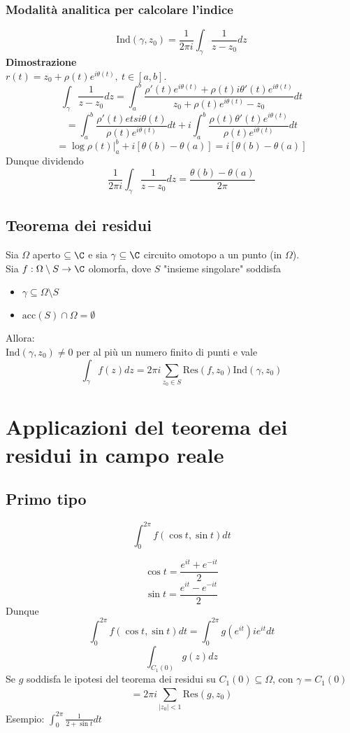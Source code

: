 \subsubsection{Modalità analitica per calcolare l'indice}
\[\text{Ind}(\gamma, z_0)=\frac{1}{2\pi i} \int_{\gamma}^{} \frac{1}{z-z_0}dz\]
\textbf{Dimostrazione} 
\\$r(t)=z_0+\rho(t)e^{i\theta(t)},\ t\in[a,b]$.
\[\int_{\gamma}^{} \frac{1}{z-z_0}dz=\int_{a}^{b} \frac{\rho'(t)e^{i\theta(t)}+\rho(t)i\theta'(t)e^{i\theta(t)}}{z_0+\rho(t)e^{i\theta(t)}-z_0}dt\]
\[=\int_{a}^{b} \frac{\rho'(t)etsi\theta(t)}{\rho(t)e^{i\theta(t)}}dt+i \int_{a}^{ b} \frac{\rho(t)\theta'(t)e^{i\theta(t)}}{\rho(t) e^{i\theta(t)}}dt\]
\[=\log\rho(t)|_a^b+i[\theta(b)-\theta(a)]=i[\theta(b)-\theta(a)]\]
Dunque dividendo
\[\frac{1}{2\pi i}\int_{\gamma}^{} \frac{1}{z-z_0}dz=\frac{\theta(b)-\theta(a)}{2\pi}\]
\subsection{Teorema dei residui}
\begin{tcolorbox}
	Sia $\Omega$ aperto $\subseteq\C$ e sia  $\gamma \subseteq\C$ circuito omotopo a un punto (in $\Omega$).
	\\Sia $f:\Omega\setminus S\to \C$ olomorfa, dove $S$ "insieme singolare" soddisfa
	\begin{itemize}
		\item $\gamma \subseteq\Omega \setminus S$
		\item $\text{acc} (S)\cap\Omega = \emptyset$
	\end{itemize}
	Allora:
	\\$\text{Ind}(\gamma,z_0)\neq 0$ per al più un numero finito di punti e vale
	\[\int_{\gamma}^{} f(z)dz=2\pi i \sum_{z_0\in S}^{} \text{Res}(f,z_0)\text{Ind}(\gamma,z_0)\] 
\end{tcolorbox}


\section{Applicazioni del teorema dei residui in campo reale}
\subsection{Primo tipo}
\begin{tcolorbox}
\[\int_{0}^{2\pi} f(\cos t, \sin t)dt\]
\end{tcolorbox}
\[\cos t = \frac{e^{it}+e^{-it}}{2}\]
\[\sin t = \frac{e^{it}-e^{-it}}{2}\]
Dunque 
\[\int_{0}^{2\pi} f(\cos t, \sin t)dt=\int_{0}^{2\pi} g(e^{it})ie^{it}dt \]
\[\int_{C_1(0)}^{} g(z)dz\]
Se $g$ soddisfa le ipotesi del teorema dei residui su $C_1(0) \subseteq  \Omega$, con $\gamma=C_1(0)$
\[=2\pi i \sum_{|z_0|<1}^{} \text{Res}(g,z_0)\]
Esempio: $\int_{0}^{2\pi} \frac{1}{2+\sin t}dt$

